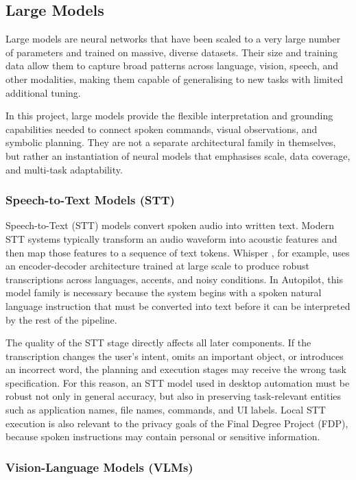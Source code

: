 \subsection{Large Models}
\label{subsec:foundation_models}

Large models are neural networks that have been scaled to a very large number of parameters and trained on massive, diverse datasets. Their size and training data allow them to capture broad patterns across language, vision, speech, and other modalities, making them capable of generalising to new tasks with limited additional tuning.

In this project, large models provide the flexible interpretation and grounding capabilities needed to connect spoken commands, visual observations, and symbolic planning. They are not a separate architectural family in themselves, but rather an instantiation of neural models that emphasises scale, data coverage, and multi-task adaptability.

\subsubsection{Speech-to-Text Models (STT)}

Speech-to-Text (STT) models convert spoken audio into written text. Modern STT systems typically transform an audio waveform into acoustic features and then map those features to a sequence of text tokens. Whisper \cite{Radford2023}, for example, uses an encoder-decoder architecture trained at large scale to produce robust transcriptions across languages, accents, and noisy conditions. In Autopilot, this model family is necessary because the system begins with a spoken natural language instruction that must be converted into text before it can be interpreted by the rest of the pipeline.

The quality of the STT stage directly affects all later components. If the transcription changes the user's intent, omits an important object, or introduces an incorrect word, the planning and execution stages may receive the wrong task specification. For this reason, an STT model used in desktop automation must be robust not only in general accuracy, but also in preserving task-relevant entities such as application names, file names, commands, and UI labels. Local STT execution is also relevant to the privacy goals of the Final Degree Project (FDP), because spoken instructions may contain personal or sensitive information.

\subsubsection{Vision-Language Models (VLMs)}


